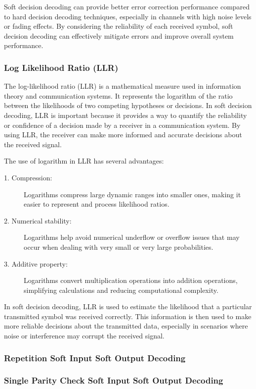 Soft decision decoding can provide better error correction performance compared to hard decision decoding techniques, especially in channels with high noise levels or fading effects. By considering the reliability of each received symbol, soft decision decoding can effectively mitigate errors and improve overall system performance.

\subsubsection{Log Likelihood Ratio (LLR)}
The log-likelihood ratio (LLR) is a mathematical measure used in information theory and communication systems. It represents the logarithm of the ratio between the likelihoods of two competing hypotheses or decisions.
In soft decision decoding, LLR is important because it provides a way to quantify the reliability or confidence of a decision made by a receiver in a communication system. By using LLR, the receiver can make more informed and accurate decisions about the received signal.

The use of logarithm in LLR has several advantages:
\begin{description}
    \item[1. Compression:] Logarithms compress large dynamic ranges into smaller ones, making it easier to represent and process likelihood ratios.
    \item[2. Numerical stability:] Logarithms help avoid numerical underflow or overflow issues that may occur when dealing with very small or very large probabilities.
    \item[3. Additive property:] Logarithms convert multiplication operations into addition operations, simplifying calculations and reducing computational complexity. 
\end{description}
In soft decision decoding, LLR is used to estimate the likelihood that a particular transmitted symbol was received correctly. This information is then used to make more reliable decisions about the transmitted data, especially in scenarios where noise or interference may corrupt the received signal.

\subsubsection{Repetition Soft Input Soft Output Decoding}
\subsubsection{Single Parity Check Soft Input Soft Output Decoding}

